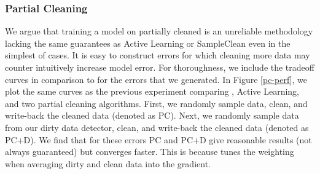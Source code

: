 \subsubsection{Partial Cleaning}
We argue that training a model on partially cleaned is an unreliable methodology lacking the same guarantees as Active Learning or SampleClean even in the simplest of cases.
It is easy to construct errors for which cleaning more data may counter intuitively increase model error.
For thoroughness, we include the tradeoff curves in comparison to \sys for the errors that we generated.
In Figure \ref{pc-perf}, we plot the same curves as the previous experiment comparing \sys, Active Learning, and two partial cleaning algorithms.
First, we randomly sample data, clean, and write-back the cleaned data (denoted as PC).
Next, we randomly sample data from our dirty data detector, clean, and write-back the cleaned data (denoted as PC+D).
We find that for these errors PC and PC+D give reasonable results (not always guaranteed) but \sys converges faster.
This is because \sys tunes the weighting when averaging dirty and clean data into the gradient.

